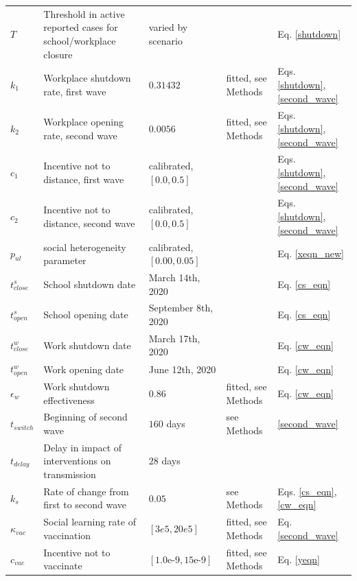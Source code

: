 \begin{table}[H]
\begin{tabular}{p{1cm} p{5cm} p{2cm} l l}
  $T$ & Threshold in active reported cases for school/workplace closure & varied by scenario  &  & Eq. \ref{shutdown} \\
  $ k_1 $ & Workplace shutdown rate, first wave & $ 0.31432$ & fitted, see Methods & Eqs. \ref{shutdown},\ref{second_wave} \\
  $ k_2 $ & Workplace opening rate, second wave & $ 0.0056$ & fitted, see Methods & Eqs. \ref{shutdown},\ref{second_wave} \\
  $ c_1 $ & Incentive not to distance, first wave & calibrated,$[0.0,0.5]$ & \cite{googlemobility, ontariocoviddata} & Eqs. \ref{shutdown},\ref{second_wave}  \\
  $ c_2 $ & Incentive not to distance, second wave & calibrated,$[0.0,0.5]$ & \cite{googlemobility, ontariocoviddata} & Eqs. \ref{shutdown},\ref{second_wave}  \\
  $ p_{ul} $ & social heterogeneity parameter & calibrated, $[0.00,0.05]$ & \cite{googlemobility, ontariocoviddata}  & Eq. \ref{xeqn_new}\\
  $ t^s_{close} $ &  School shutdown date & March 14th, 2020 & \cite{school_closure}& Eq. \ref{cs_eqn}\\
  $ t^s_{open} $ & School opening date & September 8th, 2020 &  \cite{school_opening} & Eq. \ref{cs_eqn}\\
  $ t^w_{close} $ &   Work shutdown date & March 17th, 2020 & \cite{ontario_reopening}& Eq. \ref{cw_eqn}\\
  $ t^w_{open}  $ & Work opening date &  June 12th, 2020 & \cite{ontario_reopening}& Eq. \ref{cw_eqn}\\
  $ \epsilon_w $ & Work shutdown effectiveness & $0.86$ & fitted, see Methods & Eq. \ref{cw_eqn}\\
  $ t_{switch} $ & Beginning of second wave & $160 $ days &  see Methods & \ref{second_wave}\\ 
  $ t_{delay} $ & Delay in impact of interventions on transmission & $28$ days &  \cite{li2020temporal} &  \\ 
  $k_s$ & Rate of change from first to second wave & $0.05$ &  see Methods & Eqs. \ref{cs_eqn},\ref{cw_eqn} \\
  $ \kappa_{vac}$ & Social learning rate of vaccination & $[3e5,20e5] $& fitted, see Methods & Eq.\ref{second_wave}\\
  $ c_{vac}$ & Incentive not to vaccinate & $[1.0\text{e-}9,15\text{e-}9]$& fitted, see Methods & Eq. \ref{yeqn}\\
  \bottomrule
  \end{tabular}
  \label{tab:params}
  \end{table}
\normalsize




